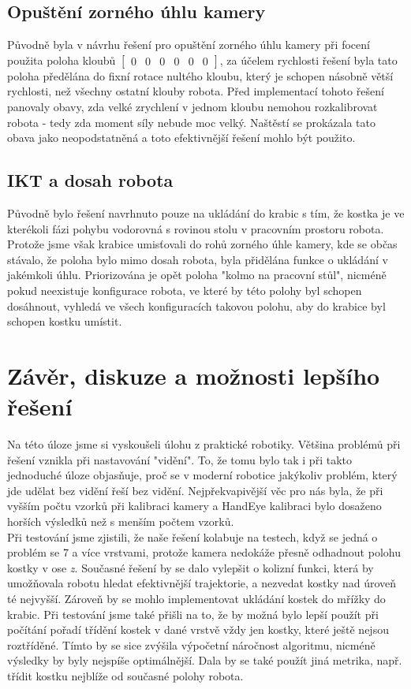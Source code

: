 \documentclass[journal,twoside,web]{ieeecolor}
\begin{document}
\subsection{Opuštění zorného úhlu kamery}
Původně byla v návrhu řešení pro opuštění zorného úhlu kamery při focení použita poloha kloubů
$\begin{bmatrix}
        0 & 0 & 0 & 0 & 0 & 0
    \end{bmatrix}$, za účelem rychlosti řešení byla tato poloha předělána do fixní rotace nultého kloubu, který je schopen
násobně větší rychlosti, než všechny ostatní klouby robota. Před implementací tohoto řešení panovaly obavy, zda velké zrychlení v
jednom kloubu nemohou rozkalibrovat robota - tedy zda moment síly nebude moc velký. Naštěstí se prokázala tato obava jako neopodstatněná
a toto efektivnější řešení mohlo být použito.

\subsection{IKT a dosah robota}
Původně bylo řešení navrhnuto pouze na ukládání do krabic s tím, že kostka je ve kterékoli fázi pohybu vodorovná s rovinou stolu v pracovním prostoru
robota. Protože jsme však krabice umisťovali do rohů zorného úhle kamery, kde se občas stávalo, že poloha bylo mimo dosah robota, byla přidělána
funkce o ukládání v jakémkoli úhlu. Priorizována je opět poloha "kolmo na pracovní stůl",
nicméně pokud neexistuje konfigurace robota, ve které by této polohy byl schopen dosáhnout, vyhledá ve všech konfiguracích takovou polohu,
aby do krabice byl schopen kostku umístit.


\section{Závěr, diskuze a možnosti lepšího řešení}
Na této úloze jsme si vyskoušeli úlohu z praktické robotiky. Většina problémů při řešení vznikla při nastavování "vidění".
To, že tomu bylo tak i při takto jednoduché úloze objasňuje, proč se v moderní robotice jakýkoliv problém, který jde udělat bez vidění
řeší bez vidění. Nejpřekvapivější věc pro nás byla, že při vyšším počtu vzorků při kalibraci kamery a HandEye kalibraci bylo dosaženo
horších výsledků než s menším počtem vzorků.\\
Při testování jsme zjistili, že naše řešení kolabuje na testech, když se jedná o problém se 7 a více vrstvami,
protože kamera nedokáže přesně odhadnout polohu kostky v ose \textit{z}.
Současné řešení by se dalo vylepšit o kolizní funkci, která by umožňovala robotu hledat efektivnější trajektorie, a nezvedat kostky
nad úroveň té nejvyšší. Zároveň by se mohlo implementovat ukládání kostek do mřížky do krabic. Při testování jsme také přišli na to,
že by možná bylo lepší použít při počítání pořadí třídění kostek v dané vrstvě vždy jen kostky, které ještě nejsou roztříděné.
Tímto by se sice zvýšila výpočetní náročnost algoritmu, nicméně výsledky by byly nejspíše optimálnější. Dala by se také použít jiná metrika,
např. třídit kostku nejblíže od současné polohy robota.
\end{document}
